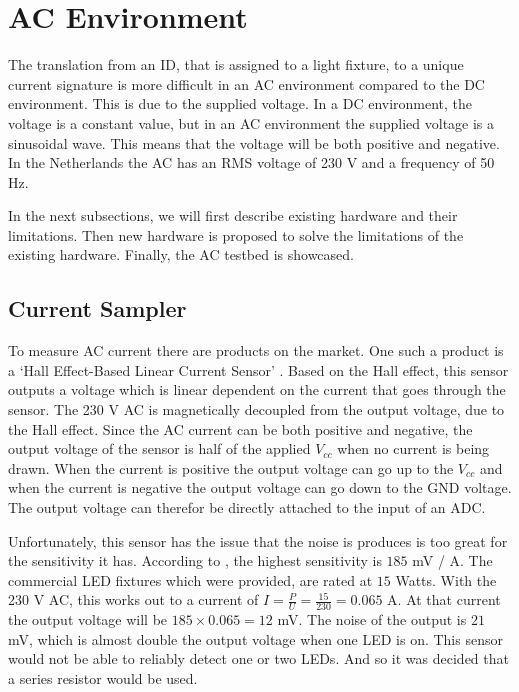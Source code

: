 
\section{AC Environment}
\label{sec:ac-environment}




The translation from an ID, that is assigned to a light fixture, to a unique current signature is more difficult in an AC environment compared to the DC environment.
This is due to the supplied voltage.
In a DC environment, the voltage is a constant value, but in an AC environment the supplied voltage is a sinusoidal wave.
This means that the voltage will be both positive and negative.
In the Netherlands the AC has an RMS voltage of 230 V and a frequency of 50 Hz.

In the next subsections, we will first describe existing hardware and their limitations.
Then new hardware is proposed to solve the limitations of the existing hardware.
Finally, the AC testbed is showcased.














\subsection{Current Sampler}

To measure AC current there are products on the market.
One such a product is a `Hall Effect-Based Linear Current Sensor' \cite{hall-ac-current-sensor-datasheet}.
Based on the Hall effect, this sensor outputs a voltage which is linear dependent on the current that goes through the sensor.
The 230 V AC is magnetically decoupled from the output voltage, due to the Hall effect.
Since the AC current can be both positive and negative, the output voltage of the sensor is half of the applied $V_{cc}$ when no current is being drawn.
When the current is positive the output voltage can go up to the $V_{cc}$ and when the current is negative the output voltage can go down to the GND voltage. 
The output voltage can therefor be directly attached to the input of an ADC.


Unfortunately, this sensor has the issue that the noise is produces is too great for the sensitivity it has.
According to \cite{hall-ac-current-sensor-datasheet}, the highest sensitivity is $185$ mV / A.
The commercial LED fixtures which were provided, are rated at $15$ Watts.
With the 230 V AC, this works out to a current of $I = \frac{P}{U} = \frac{15}{230} = 0.065$ A.
At that current the output voltage will be $185 \times 0.065 = 12$ mV.
The noise of the output is $21$ mV, which is almost double the output voltage when one LED is on.
This sensor would not be able to reliably detect one or two LEDs.
And so it was decided that a series resistor would be used.

